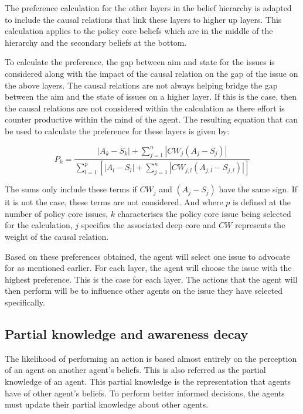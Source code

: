 The preference calculation for the other layers in the belief hierarchy is adapted to include the causal relations that link these layers to higher up layers. This calculation applies to the policy core beliefs which are in the middle of the hierarchy and the secondary beliefs at the bottom.

To calculate the preference, the gap between aim and state for the issues is considered along with the impact of the causal relation on the gap of the issue on the above layers. The causal relations are not always helping bridge the gap between the aim and the state of issues on a higher layer. If this is the case, then the causal relations are not considered within the calculation as there effort is counter productive within the mind of the agent. The resulting equation that can be used to calculate the preference for these layers is given by:

\begin{equation}\label{eq:preference2}
P_k= \frac{ |A_k - S_k| + \sum_{j=1}^n |CW_j \left( A_j - S_j \right)|}{\sum_{l=1}^p \left[ |A_l - S_l| + \sum_{j=1}^n \left|CW_{j,l} \left( A_{j,l} - S_{j,l} \right) \right| \right]}
\end{equation}

The sums only include these terms if $CW_j$ and $\left( A_j - S_j \right)$ have the same sign. If it is not the case, these terms are not considered. And where $p$ is defined at the number of policy core issues, $k$ characterises the policy core issue being selected for the calculation, $j$ specifies the associated deep core and $CW$ represents the weight of the causal relation.

Based on these preferences obtained, the agent will select one issue to advocate for as mentioned earlier. For each layer, the agent will choose the issue with the highest preference. This is the case for each layer. The actions that the agent will then perform will be to influence other agents on the issue they have selected specifically.

\subsection{Partial knowledge and awareness decay}

The likelihood of performing an action is based almost entirely on the perception of an agent on another agent’s beliefs. This is also referred as the partial knowledge of an agent. This partial knowledge is the representation that agents have of other agent’s beliefs. To perform better informed decisions, the agents must update their partial knowledge about other agents.

